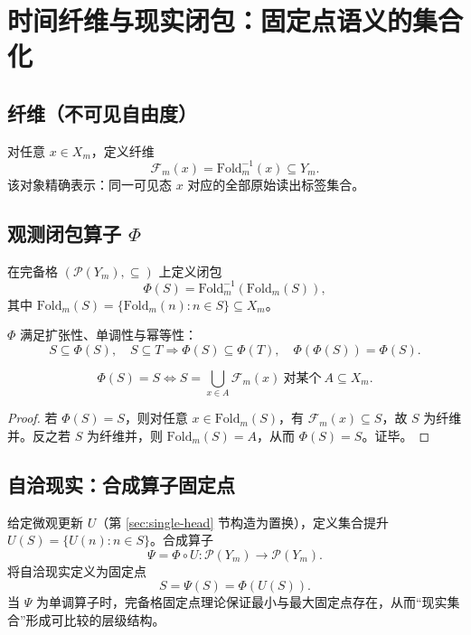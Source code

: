 \section{时间纤维与现实闭包：固定点语义的集合化}

\subsection{纤维（不可见自由度）}

对任意 $x\in X_m$，定义纤维
\[
\mathcal{F}_m(x)=\mathrm{Fold}_m^{-1}(x)\subseteq Y_m.
\]
该对象精确表示：同一可见态 $x$ 对应的全部原始读出标签集合。

\subsection{观测闭包算子 \texorpdfstring{$\Phi$}{Phi}}

在完备格 $(\mathcal{P}(Y_m),\subseteq)$ 上定义闭包
\[
\Phi(S)=\mathrm{Fold}_m^{-1}(\mathrm{Fold}_m(S)),
\]
其中 $\mathrm{Fold}_m(S)=\{\mathrm{Fold}_m(n):n\in S\}\subseteq X_m$。

\begin{lemma}\label{lem:closure-properties}
$\Phi$ 满足扩张性、单调性与幂等性：
\[
S\subseteq \Phi(S),\quad S\subseteq T\Rightarrow \Phi(S)\subseteq \Phi(T),\quad \Phi(\Phi(S))=\Phi(S).
\]
\end{lemma}

\begin{theorem}[闭包固定点刻画]\label{thm:closure-fix}
\[
\Phi(S)=S\iff S=\bigcup_{x\in A}\mathcal{F}_m(x)\ \text{对某个}\ A\subseteq X_m.
\]
\end{theorem}

\begin{proof}
若 $\Phi(S)=S$，则对任意 $x\in \mathrm{Fold}_m(S)$，有 $\mathcal{F}_m(x)\subseteq S$，故 $S$ 为纤维并。反之若 $S$ 为纤维并，则 $\mathrm{Fold}_m(S)=A$，从而 $\Phi(S)=S$。证毕。
\end{proof}

\subsection{自洽现实：合成算子固定点}

给定微观更新 $U$（第 \ref{sec:single-head} 节构造为置换），定义集合提升 $U(S)=\{U(n):n\in S\}$。合成算子
\[
\Psi=\Phi\circ U:\mathcal{P}(Y_m)\to\mathcal{P}(Y_m).
\]
将自洽现实定义为固定点
\[
S=\Psi(S)=\Phi(U(S)).
\]
当 $\Psi$ 为单调算子时，完备格固定点理论保证最小与最大固定点存在，从而“现实集合”形成可比较的层级结构。

